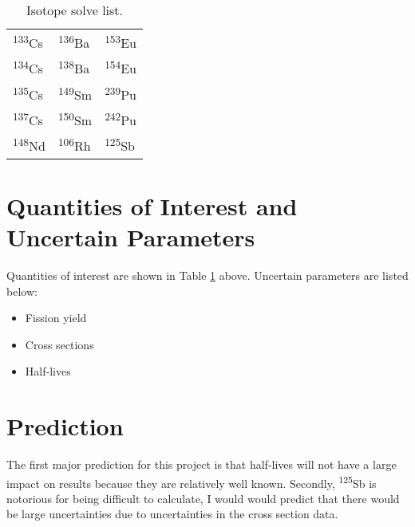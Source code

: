 \documentclass[11pt,notitlepage]{article}
\newcommand{\tss}{\textsuperscript}
\begin{document}
\begin{table}[H]
  \begin{center}
    \caption{Isotope solve list.}
    \label{Table:1}
    \begin{tabular}{l l l}
      \toprule
      \tss{133}Cs & \tss{136}Ba & \tss{153}Eu\\
      \tss{134}Cs & \tss{138}Ba & \tss{154}Eu\\
      \tss{135}Cs & \tss{149}Sm & \tss{239}Pu\\
      \tss{137}Cs & \tss{150}Sm & \tss{242}Pu\\
      \tss{148}Nd & \tss{106}Rh & \tss{125}Sb\\
      \bottomrule
    \end{tabular}
  \end{center}
\end{table}


\section{Quantities of Interest and Uncertain Parameters}

Quantities of interest are shown in Table \ref{Table:1} above.
Uncertain parameters are listed below:

\begin{itemize}
\item{Fission yield}
\item{Cross sections}
\item{Half-lives}
\end{itemize}


\section{Prediction}

The first major prediction for this project is that half-lives
will not have a large impact on results because they are
relatively well known. Secondly, \tss{125}Sb is notorious
for being difficult to calculate, I would would predict that
there would be large uncertainties due to uncertainties in
the cross section data.

\end{document}
